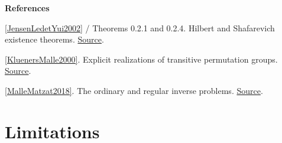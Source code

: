 \documentclass[11pt,a4paper,oneside,openany]{book}
\newenvironment{sources}{\par\smallskip\begingroup\footnotesize\color{atlasgray}\leftskip=10pt\setlength{\parskip}{2pt}}{\par\endgroup\smallskip}
\begin{document}
\begin{sources}
\textbf{References}\par\smallskip
\noindent\hyperlink{ref:JensenLedetYui2002}{[JensenLedetYui2002]} / Theorems 0.2.1 and 0.2.4. Hilbert and Shafarevich existence theorems. \href{https://library.slmath.org/books/Book45/index.html}{Source}.\par
\noindent\hyperlink{ref:KluenersMalle2000}{[KluenersMalle2000]}. Explicit realizations of transitive permutation groups. \href{https://doi.org/10.1006/jsco.2000.0378}{Source}.\par
\noindent\hyperlink{ref:MalleMatzat2018}{[MalleMatzat2018]}. The ordinary and regular inverse problems. \href{https://link.springer.com/book/10.1007/978-3-662-55420-3}{Source}.\par
\end{sources}\color{black}
\section{Limitations}
\end{document}
